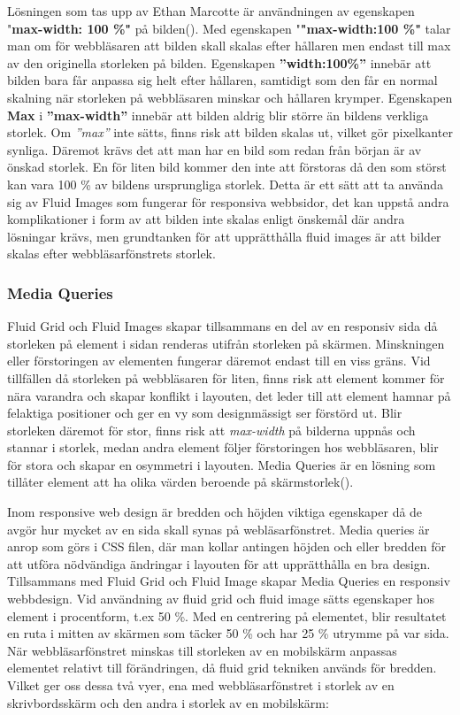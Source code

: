 \documentclass[11pt]{article}
\begin{document}
Lösningen som tas upp av Ethan Marcotte är användningen av egenskapen "\textbf{max-width: 100 \%"} på bilden(\cite[s. 45]{resp}). Med egenskapen "\textbf{"max-width:100 \%"}  talar man om för webbläsaren att bilden skall skalas efter hållaren men endast till max av den originella storleken på bilden. Egenskapen \textbf{”width:100\%”} innebär att bilden bara får anpassa sig helt efter hållaren, samtidigt som den får en normal skalning när storleken på webbläsaren minskar och hållaren krymper. Egenskapen \textbf{Max} i \textbf{”max-width”} innebär att bilden aldrig blir större än bildens verkliga storlek. Om \textit{”max”} inte sätts, finns risk att bilden skalas ut, vilket gör pixelkanter synliga. Däremot krävs det att man har en bild som redan från början är av önskad storlek. En för liten bild kommer den inte att förstoras då den som störst kan vara 100 \% av bildens ursprungliga storlek. Detta är ett sätt att ta använda sig av Fluid Images som fungerar för responsiva webbsidor, det kan uppstå andra komplikationer i form av att bilden inte skalas enligt önskemål där andra lösningar krävs, men grundtanken för att upprätthålla fluid images är att bilder skalas efter webbläsarfönstrets storlek.

\subsubsection{Media Queries}
Fluid Grid och Fluid Images skapar tillsammans en del av en responsiv sida då storleken på element i sidan renderas utifrån storleken på skärmen. Minskningen eller förstoringen av elementen fungerar däremot endast till en viss gräns. Vid tillfällen då storleken på webbläsaren för liten, finns risk att element kommer för nära varandra och skapar konflikt i layouten, det leder till att element hamnar på felaktiga positioner och ger en vy som designmässigt ser förstörd ut. Blir storleken däremot för stor, finns risk att \textit{max-width} på bilderna uppnås och stannar i storlek, medan andra element följer förstoringen hos webbläsaren, blir för stora och skapar en osymmetri i layouten. Media Queries är en lösning som tillåter element att ha olika värden beroende på skärmstorlek(\cite[s. 65]{resp}).

Inom responsive web design är bredden och höjden viktiga egenskaper då de avgör hur mycket av en sida skall synas på webläsarfönstret.  Media queries är anrop som görs i CSS filen, där man kollar antingen höjden och eller bredden för att utföra nödvändiga ändringar i layouten för att upprätthålla en bra design. Tillsammans med Fluid Grid och Fluid Image skapar Media Queries en responsiv webbdesign. 
\newpage
Vid användning av fluid grid och fluid image sätts egenskaper hos element i procentform, t.ex 50 \%. Med en centrering på elementet, blir resultatet en ruta i mitten av skärmen som täcker 50 \% och har 25 \% utrymme på var sida. När webbläsarfönstret minskas till storleken av en mobilskärm anpassas elementet relativt till förändringen, då fluid grid tekniken används för bredden. Vilket ger oss dessa två vyer, ena med webbläsarfönstret i storlek av en skrivbordsskärm och den andra i storlek av en mobilskärm:
\end{document}
